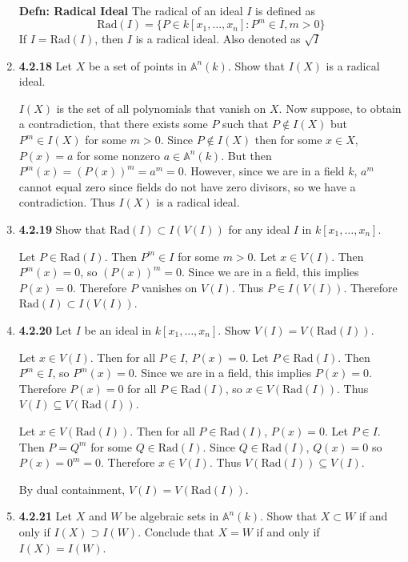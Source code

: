 \documentclass[12pt]{article}
\newcommand{\A}{\mathbb{A}}
\newcommand{\Rad}{\text{Rad}}
\begin{document}
\begin{enumerate}
\begin{enumerate}
    \end{enumerate}
    
    \textbf{Defn: Radical Ideal} The radical of an ideal $I$ is defined as
    \[\Rad(I) = \{P \in k[x_1,\dots,x_n] : P^m \in I, m>0\}\]
    If $I=\Rad (I)$, then $I$ is a radical ideal.  Also denoted as $\sqrt{I}$
    
    \item \textbf{4.2.18}  Let $X$ be a set of points in $\A^n(k)$.  Show that $I(X)$ is a radical ideal.
      
      $I(X)$ is the set of all polynomials that vanish on $X$.  Now suppose, to obtain a contradiction, that there exists some $P$ such that $P\not\in I(X)$ but $P^m \in I(X)$ for some $m>0$.  Since $P\not\in I(X)$ then for some $x\in X$, $P(x) = a$ for some nonzero $a\in \A^n(k)$.  But then $P^m(x) = (P(x))^m = a^m = 0$.  However, since we are in a field $k$, $a^m$ cannot equal zero since fields do not have zero divisors, so we have a contradiction.  Thus $I(X)$ is a radical ideal.
      
    \item \textbf{4.2.19}  Show that $\Rad(I)\subset I(V(I))$ for any ideal $I$ in $k[x_1,\dots, x_n]$.
      
      Let $P\in \Rad(I)$.  Then $P^m \in I$ for some $m>0$.  Let $x\in V(I)$.  Then $P^m(x) = 0$, so $(P(x))^m = 0$.  Since we are in a field, this implies $P(x)=0$.  Therefore $P$ vanishes on $V(I)$.  Thus $P\in I(V(I))$.  Therefore $\Rad(I)\subset I(V(I))$.
     
    \item \textbf{4.2.20}  Let $I$ be an ideal in $k[x_1,\dots, x_n]$.  Show $V(I)=V(\Rad(I))$.
      
    Let $x \in V(I)$.  Then for all $P\in I$, $P(x)=0$.  Let $P\in \Rad(I)$.  Then $P^m \in I$, so $P^m(x) = 0$.  
    Since we are in a field, this implies $P(x)=0$. Therefore $P(x) = 0$ for all $P\in \Rad(I)$, so $x\in V(\Rad(I))$.  
    Thus $V(I)\subseteq V(\Rad(I))$.
    
    Let $x \in V(\Rad(I))$.  Then for all $P\in \Rad(I)$, $P(x)=0$.  Let $P\in I$.  Then $P = Q^m$ for some $Q \in \Rad(I)$.  Since $Q\in \Rad(I)$, $Q(x)=0$ so $P(x) = 0^m = 0$.  Therefore $x\in V(I)$.  Thus $V(\Rad(I)) \subseteq V(I)$.
    
    By dual containment, $V(I)=V(\Rad(I))$.  
     
        \item \textbf{4.2.21} Let $X$ and $W$ be algebraic sets in $\A^n(k)$.  Show that $X\subset W$ if and only if $I(X)\supset I(W)$.  Conclude that $X= W$ if and only if $I(X)= I(W)$. 
        

\end{enumerate}
\end{document}
